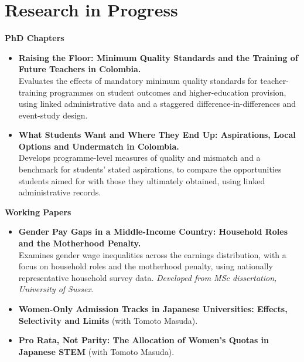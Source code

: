 \documentclass[10pt,a4paper]{article}
\begin{document}
\section{Research in Progress}
\textbf{\small PhD Chapters}
\begin{itemize}
  \item \textbf{Raising the Floor: Minimum Quality Standards and the Training of Future Teachers in Colombia.}\\
  Evaluates the effects of mandatory minimum quality standards for teacher-training programmes on student outcomes and higher-education provision, using linked administrative data and a staggered difference-in-differences and event-study design.
  \item \textbf{What Students Want and Where They End Up: Aspirations, Local Options and Undermatch in Colombia.}\\
  Develops programme-level measures of quality and mismatch and a benchmark for students' stated aspirations, to compare the opportunities students aimed for with those they ultimately obtained, using linked administrative records.
\end{itemize}

\vspace{0.6ex}
\textbf{\small Working Papers}
\begin{itemize}
  \item \textbf{Gender Pay Gaps in a Middle-Income Country: Household Roles and the Motherhood Penalty.}\\
  Examines gender wage inequalities across the earnings distribution, with a focus on household roles and the motherhood penalty, using nationally representative household survey data. \textit{Developed from MSc dissertation, University of Sussex.}
  \item \textbf{Women-Only Admission Tracks in Japanese Universities: Effects, Selectivity and Limits} \textmd{(with Tomoto Masuda).}
  \item \textbf{Pro Rata, Not Parity: The Allocation of Women's Quotas in Japanese STEM} \textmd{(with Tomoto Masuda).}
\end{itemize}

\end{document}
